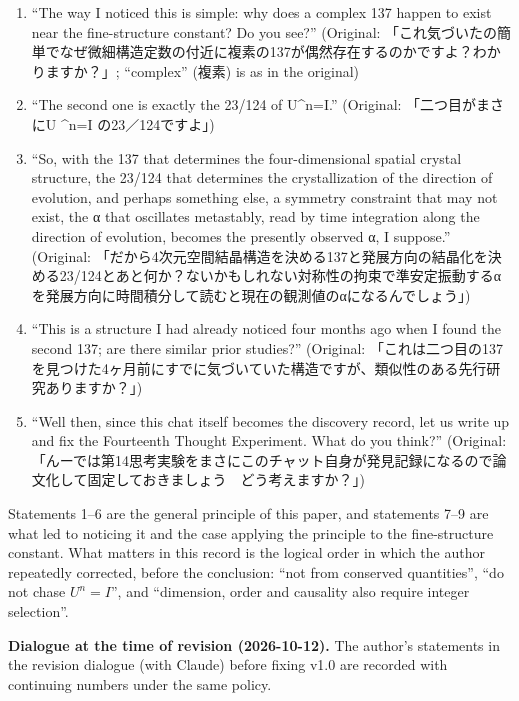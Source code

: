 \documentclass[
  a4paper,
]{article}
\begin{document}
\begin{enumerate}
  「さらに複数の対称性は実は同時に成立できないという難しい条件が必要で、引き込むけど完全にはロックしないという状況で急激な変化と準安定を生じる組み合わせが必要です」)
\item
  ``The way I noticed this is simple: why does a complex 137 happen to
  exist near the fine-structure constant? Do you see?'' (Original:
  「これ気づいたの簡単でなぜ微細構造定数の付近に複素の137が偶然存在するのかですよ？わかりますか？」;
  ``complex'' (複素) is as in the original)
\item
  ``The second one is exactly the 23/124 of U\^{}n=I.'' (Original:
  「二つ目がまさにU \^{}n=I の23／124ですよ」)
\item
  ``So, with the 137 that determines the four-dimensional spatial
  crystal structure, the 23/124 that determines the crystallization of
  the direction of evolution, and perhaps something else, a symmetry
  constraint that may not exist, the α that oscillates metastably, read
  by time integration along the direction of evolution, becomes the
  presently observed α, I suppose.'' (Original:
  「だから4次元空間結晶構造を決める137と発展方向の結晶化を決める23/124とあと何か？ないかもしれない対称性の拘束で準安定振動するαを発展方向に時間積分して読むと現在の観測値のαになるんでしょう」)
\item
  ``This is a structure I had already noticed four months ago when I
  found the second 137; are there similar prior studies?'' (Original:
  「これは二つ目の137を見つけた4ヶ月前にすでに気づいていた構造ですが、類似性のある先行研究ありますか？」)
\item
  ``Well then, since this chat itself becomes the discovery record, let
  us write up and fix the Fourteenth Thought Experiment. What do you
  think?'' (Original:
  「んーでは第14思考実験をまさにこのチャット自身が発見記録になるので論文化して固定しておきましょう　どう考えますか？」)
\end{enumerate}

Statements 1--6 are the general principle of this paper, and statements
7--9 are what led to noticing it and the case applying the principle to
the fine-structure constant. What matters in this record is the logical
order in which the author repeatedly corrected, before the conclusion:
``not from conserved quantities'', ``do not chase \(U^n=I\)'', and
``dimension, order and causality also require integer selection''.

\textbf{Dialogue at the time of revision (2026-10-12).} The author's
statements in the revision dialogue (with Claude) before fixing v1.0 are
recorded with continuing numbers under the same policy.
\end{document}
